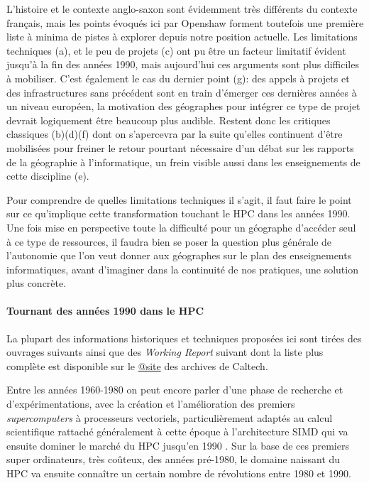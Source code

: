L'histoire et le contexte anglo-saxon sont évidemment très différents du contexte français, mais les points évoqués ici par Openshaw forment toutefois une première liste à minima de pistes à explorer depuis notre position actuelle. Les limitations techniques (a), et le peu de projets (c) ont pu être un facteur limitatif évident jusqu'à la fin des années 1990, mais aujourd'hui ces arguments sont plus difficiles à mobiliser. C'est également le cas du dernier point (g): des appels à projets et des infrastructures sans précédent sont en train d'émerger ces dernières années à un niveau européen, la motivation des géographes pour intégrer ce type de projet devrait logiquement être beaucoup plus audible. Restent donc les critiques classiques (b)(d)(f) dont on s'apercevra par la suite qu'elles continuent d'être mobilisées pour freiner le retour pourtant nécessaire d'un débat sur les rapports de la géographie à l'informatique, un frein visible aussi dans les enseignements de cette discipline (e).

Pour comprendre de quelles limitations techniques il s'agit, il faut faire le point sur ce qu'implique cette transformation touchant le HPC dans les années 1990. Une fois mise en perspective toute la difficulté pour un géographe d'accéder seul à ce type de ressources, il faudra bien se poser la question plus générale de l'autonomie que l'on veut donner aux géographes sur le plan des enseignements informatiques, avant d'imaginer dans la continuité de nos pratiques, une solution plus concrète.

\paragraph{Tournant des années 1990 dans le HPC}
\label{p:Tournant1980}

La plupart des informations historiques et techniques proposées ici sont tirées des ouvrages suivants \autocites{Fox1994, Fox1988, Seitz1985, CM2-1990, Lerman1993, Padua2011, Dietrich1984}[81-84]{Culler1998, Steele2011} ainsi que des \textit{Working Report} suivant \autocites{Athas1987, Su1987, Seitz1983, Seitz1984a, Seitz1984b} dont la liste plus complète est disponible sur le \href{http://authors.library.caltech.edu/view/person-az/Seitz-C-L.html}{@site} des archives de Caltech.

Entre les années 1960-1980 on peut encore parler d'une phase de recherche et d'expérimentations, avec la création et l'amélioration des premiers \textit{supercomputers} à processeurs vectoriels, particulièrement adaptés au calcul scientifique rattaché généralement à cette époque à l'architecture SIMD  qui va ensuite dominer le marché du HPC jusqu'en 1990 . Sur la base de ces premiers super ordinateurs, très coûteux, des années pré-1980, le domaine naissant du HPC va ensuite connaître un certain nombre de révolutions entre 1980 et 1990.

